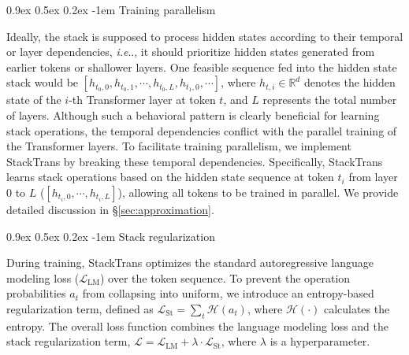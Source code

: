 \documentclass{article}
\makeatletter
\providecommand{\paragraph}{}
\renewcommand{\paragraph}[1]{%
  \@startsection{paragraph}{4}{\z@}%
                {0.9ex \@plus 0.5ex \@minus 0.2ex}%
                {-1em}%
                {\normalsize\bfseries}%
  {#1}
}
\DeclareRobustCommand\onedot{\futurelet\@let@token\@onedot}
\def\@onedot{\ifx\@let@token.\else.\null\fi\xspace}
\def\ie{\emph{i.e}\onedot} \def\Ie{\emph{I.e}\onedot}
\DeclareRobustCommand{\method}{{\sc StackTrans}\xspace}
\makeatother
\begin{document}
\paragraph{Training parallelism}
\label{sec:trainingparall}
Ideally, the stack is supposed to process hidden states according to their temporal or layer dependencies, \ie, it should prioritize hidden states generated from earlier tokens or shallower layers.
One feasible sequence fed into the hidden state stack would be $\left[h_{{t_0},0},h_{{t_0},1},\cdots,h_{{t_0},L},h_{{t_1},0},\cdots\right]$, where $h_{t,i}\in\mathbb{R}^d$ denotes the hidden state of the $i$-th Transformer layer at token $t$, and $L$ represents the total number of layers.
Although such a behavioral pattern is clearly beneficial for learning stack operations, the temporal dependencies conflict with the parallel training of the Transformer layers.
To facilitate training parallelism, we implement \method by breaking these temporal dependencies.
Specifically, \method learns stack operations based on the hidden state sequence at token $t_i$ from layer $0$ to $L$ ($\left[h_{{t_i},0},\cdots,h_{{t_i},L}\right]$), allowing all tokens to be trained in parallel. 
We provide detailed discussion in \S\ref{sec:approximation}.

\paragraph{Stack regularization}
During training, \method optimizes the standard autoregressive language modeling loss ($\mathcal{L}_\text{LM}$) over the token sequence. 
To prevent the operation probabilities $a_t$ from collapsing into uniform, we introduce an entropy-based regularization term, defined as $\mathcal{L}_{\text{St}} = \sum_t \mathcal{H}(a_t)$, where $\mathcal{H}(\cdot)$ calculates the entropy.
The overall loss function combines the language modeling loss and the stack regularization term, $\mathcal{L}=\mathcal{L}_\text{LM}+\lambda\cdot\mathcal{L}_{\text{St}}$, where $\lambda$ is a hyperparameter.
\end{document}
